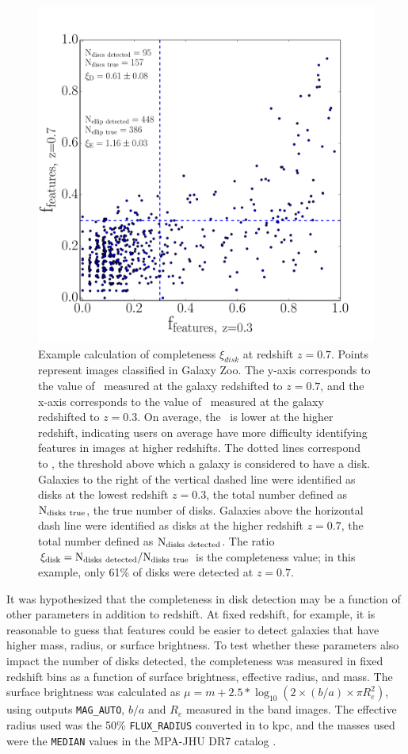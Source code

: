 \documentclass[useAMS,usenatbib]{mn2e}
\begin{document}
\begin{figure}
\centering
\includegraphics[width=.4\textwidth]{figures/incompleteness_z7.pdf}
\caption{Example calculation of completeness $\xi_{disk}$ at redshift $z=0.7$. Points represent  images classified in Galaxy Zoo. The y-axis corresponds to the value of \ffeatures~measured at the galaxy redshifted to $z=0.7$, and the x-axis corresponds to the value of \ffeatures~measured at the galaxy redshifted to $z=0.3$. On average, the \ffeatures~is lower at the higher redshift, indicating users on average have more difficulty identifying features in images at higher redshifts. The dotted lines correspond to , the threshold above which a galaxy is considered to have a disk. Galaxies to the right of the vertical dashed line were identified as disks at the lowest redshift $z=0.3$, the total number defined as $\rm N_{disks~true}$, the true number of disks. Galaxies above the horizontal dash line were identified as disks at the higher redshift $z=0.7$, the total number defined as $\rm N_{disks~detected}$. The ratio $\rm \xi_{disk}=N_{disks~detected}/N_{disks~true}$ is the completeness value; in this example, only 61\% of disks were detected at $z=0.7$.}
\label{fig:inc_subplot}
\end{figure}

It was hypothesized that the completeness in disk detection may be a function of other parameters in addition to redshift. At fixed redshift, for example, it is reasonable to guess that features could be easier to detect galaxies that have higher mass, radius, or surface brightness. To test whether these parameters also impact the number of disks detected, the completeness was measured in fixed redshift bins as a function of surface brightness, effective radius, and mass. The surface brightness was calculated as $\mu = m + 2.5*\log_{10}{(2 \times (b/a) \times \pi R_e^2 )}$, using \sextractor{} outputs {\tt MAG\_AUTO}, $b/a$ and $R_{e}$ measured in the \Iband{} band images. The effective radius used was the 50\% {\tt FLUX\_RADIUS} converted in to kpc, and the masses used were the {\tt MEDIAN} values in the MPA-JHU DR7 catalog \citep{Kauffmann2003b}.
\end{document}
